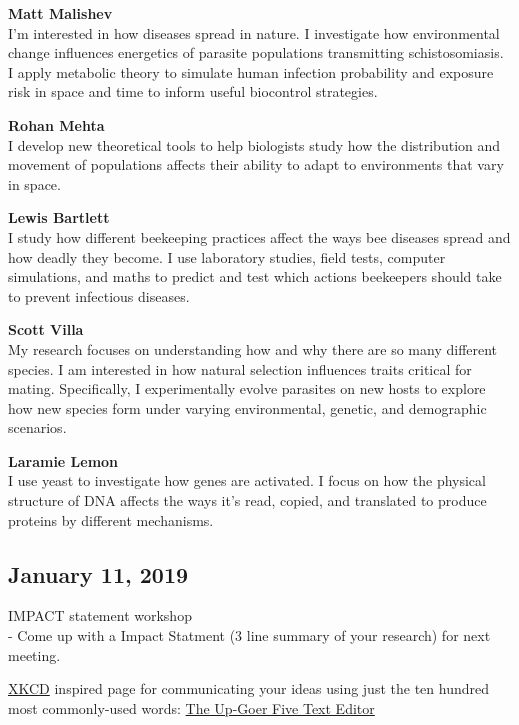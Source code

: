 \documentclass[10,portrait]{article}
\begin{document}
\textbf{Matt Malishev}\\
I'm interested in how diseases spread in nature. I investigate how
environmental change influences energetics of parasite populations
transmitting schistosomiasis. I apply metabolic theory to simulate human
infection probability and exposure risk in space and time to inform
useful biocontrol strategies.

\textbf{Rohan Mehta}\\
I develop new theoretical tools to help biologists study how the
distribution and movement of populations affects their ability to adapt
to environments that vary in space.

\textbf{Lewis Bartlett}\\
I study how different beekeeping practices affect the ways bee diseases
spread and how deadly they become. I use laboratory studies, field
tests, computer simulations, and maths to predict and test which actions
beekeepers should take to prevent infectious diseases.

\textbf{Scott Villa}\\
My research focuses on understanding how and why there are so many
different species. I am interested in how natural selection influences
traits critical for mating. Specifically, I experimentally evolve
parasites on new hosts to explore how new species form under varying
environmental, genetic, and demographic scenarios.

\textbf{Laramie Lemon}\\
I use yeast to investigate how genes are activated. I focus on how the
physical structure of DNA affects the ways it's read, copied, and
translated to produce proteins by different mechanisms.

\newpage    

\subsection{January 11, 2019}\label{january-11-2019}

IMPACT statement workshop\\
- Come up with a Impact Statment (3 line summary of your research) for
next meeting.

\href{https://xkcd.com/}{XKCD} inspired page for communicating your
ideas using just the ten hundred most commonly-used words:
\href{http://splasho.com/upgoer5/}{The Up-Goer Five Text Editor}
\end{document}
